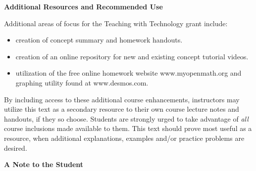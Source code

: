 
\begin{center}\textbf{Additional Resources and Recommended Use} \end{center}\par \noindent Additional areas of focus for the Teaching with Technology grant include:
\begin{itemize}
	\item creation of concept summary and homework handouts.
	\item creation of an online repository for new and existing concept tutorial videos.
	\item utilization of the free online homework website www.myopenmath.org and graphing utility found at www.desmos.com.
\end{itemize}
\indent By including access to these additional course enhancements, instructors may utilize this text as a secondary resource to their own course lecture notes and handouts, if they so choose.  Students are strongly urged to take advantage of \textit{all} course inclusions made available to them.  This text should prove most useful as a resource, when additional explanations, examples and/or practice problems are desired.
\par
\begin{center}\textbf{A Note to the Student} \end{center}\par

